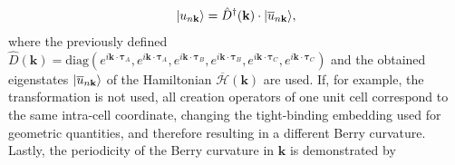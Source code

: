\begin{align}
 \lvert u_{n\mathbf{k}} \rangle = \hat{D}^\dagger(\mathbf{k})\cdot \lvert \overline{u}_{n\mathbf{k}} \rangle,
 \label{eq: appB transf eigenstate}
\end{align}
where the previously defined $\hat{D}(\mathbf{k}) = \text{diag}\left(e^{i\mathbf{k}\cdot\bm{\tau}_A}, e^{i\mathbf{k}\cdot\bm{\tau}_A}, e^{i\mathbf{k}\cdot\bm{\tau}_B}, e^{i\mathbf{k}\cdot\bm{\tau}_B}, e^{i\mathbf{k}\cdot\bm{\tau}_C}, e^{i\mathbf{k}\cdot\bm{\tau}_C}\right)$ and the obtained eigenstates $\lvert \overline{u}_{n\mathbf{k}} \rangle$ of the Hamiltonian $\overline{\mathcal{H}}(\mathbf{k})$ are used.
If, for example, the transformation is not used, all creation operators of one unit cell correspond to the same intra-cell coordinate, changing the tight-binding embedding used for geometric quantities, and therefore resulting in a different Berry curvature.
Lastly, the periodicity of the Berry curvature in $\mathbf{k}$ is demonstrated by
